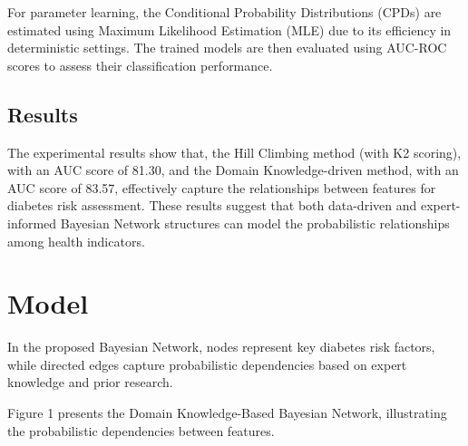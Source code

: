 \documentclass[letterpaper]{article}
\begin{document}



For parameter learning, the Conditional Probability Distributions (CPDs) are estimated using Maximum Likelihood Estimation (MLE) due to its efficiency in deterministic settings. The trained models are then evaluated using AUC-ROC scores to assess their classification performance.  


\subsection{Results}

The experimental results show that, the Hill Climbing method (with K2 scoring), with an AUC score of 81.30, and the Domain Knowledge-driven method, with an AUC score of 83.57, effectively capture the relationships between features for diabetes risk assessment. These results suggest that both data-driven and expert-informed Bayesian Network structures can model the probabilistic relationships among health indicators.

\section{Model}


In the proposed Bayesian Network, nodes represent key diabetes risk factors, while directed edges capture probabilistic dependencies based on expert knowledge and prior research. 

Figure 1 presents the Domain Knowledge-Based Bayesian Network, illustrating the probabilistic dependencies between features.
\end{document}
